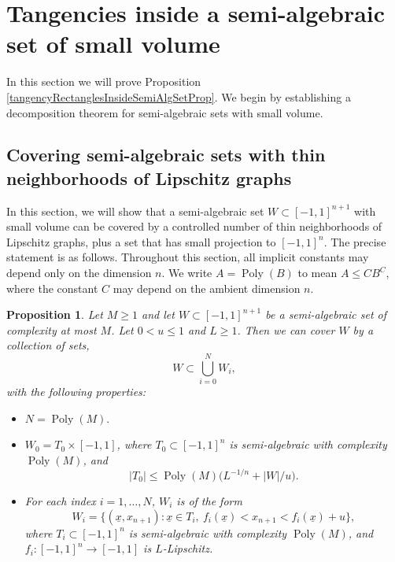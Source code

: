 \documentclass[letterpaper, reqno,11pt]{article}
\numberwithin{equation}{section}
\newcommand{\poly}{\operatorname{Poly}}
\numberwithin{thm}{section}
\newtheorem{prop}[thm]{Proposition}
\theoremstyle{remark}
\begin{document}



\section{Tangencies inside a semi-algebraic set of small volume}\label{tangenciesSemiSmallVolSec}

In this section we will prove Proposition \ref{tangencyRectanglesInsideSemiAlgSetProp}. We begin by establishing a decomposition theorem for semi-algebraic sets with small volume.


\subsection{Covering semi-algebraic sets with thin neighborhoods of Lipschitz graphs}


In this section, we will show that a semi-algebraic set $W\subset[-1,1]^{n+1}$ with small volume can be covered by a controlled number of thin neighborhoods of Lipschitz graphs, plus a set that has small projection to $[-1,1]^n$. The precise statement is as follows. Throughout this section, all implicit constants may depend only on the dimension $n$. We write $A = \poly(B)$ to mean $A\leq C B^C$, where the constant $C$ may depend on the ambient dimension $n$.


\begin{prop}\label{coverByLipschitzGraph}
Let $M\geq 1$ and let $W\subset [-1,1]^{n+1}$ be a semi-algebraic set of complexity at most $M$. Let $0<u\leq 1$ and $L\geq 1$. Then we can cover $W$ by a collection of sets,
\begin{equation}\label{SCoveringEqn}
W \subset \bigcup_{i=0}^N W_i,
\end{equation}
with the following properties:
\begin{itemize}

\item[(i)]  $N = \poly(M).$

\item[(ii)] $W_0 = T_0\times [-1,1]$, where $T_0\subset [-1,1]^n$ is semi-algebraic with complexity $\poly(M)$, and 
\begin{equation}\label{boundOnSizeT0}
|T_0|\leq \poly(M)\big(L^{-1/n} + |W|/u\big).
\end{equation}

\item[(iii)] For each index $i=1,\ldots,N$, $W_i$ is of the form
\begin{equation}\label{WiOfTheForm}
W_i = \{(\underline x, x_{n+1})\colon \underline x \in T_i,\ f_i(\underline x)< x_{n+1} < f_i(\underline x)+u\},
\end{equation}
where $T_i\subset [-1,1]^n$ is semi-algebraic with complexity $\poly(M)$, and $f_i\colon [-1,1]^n\to[-1,1]$ is $L$-Lipschitz.%
\end{itemize}
\end{prop}
\end{document}
